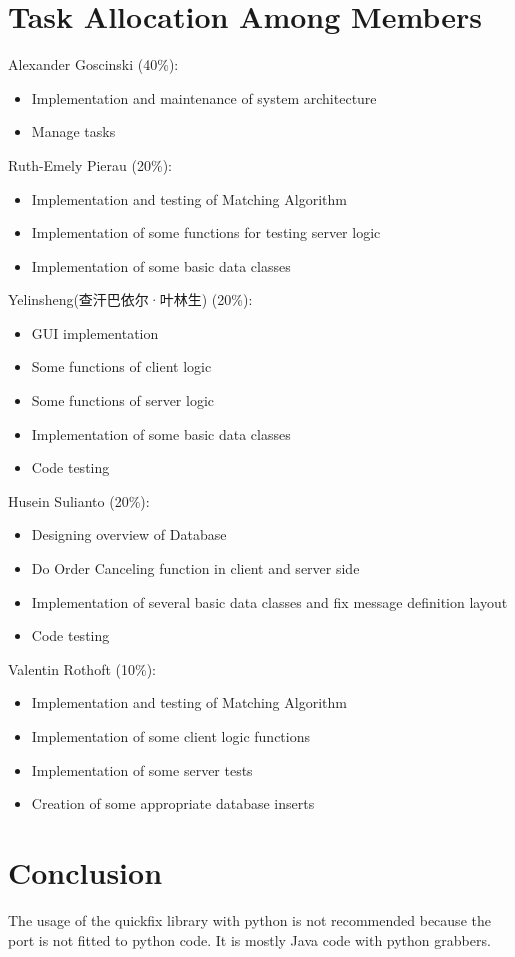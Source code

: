 \documentclass[a4paper, 11pt]{article}
\begin{document}
\section*{Task Allocation Among Members}

Alexander Goscinski (40\%):
\begin{itemize}
  \item Implementation and maintenance of system architecture
  \item Manage tasks
\end{itemize}
Ruth-Emely Pierau (20\%):
\begin{itemize}
	\item Implementation and testing of Matching Algorithm
	\item Implementation of some functions for testing server logic
	\item Implementation of some basic data classes
\end{itemize}
Yelinsheng(查汗巴依尔·叶林生) (20\%):
\begin{itemize}
  \item GUI implementation
  \item Some functions of client logic
  \item Some functions of server logic
  \item Implementation of some basic data classes
  \item Code testing
\end{itemize}
Husein Sulianto (20\%):
\begin{itemize}
  \item Designing overview of Database
  \item Do Order Canceling function in client and server side
  \item Implementation of several basic data classes and fix message definition layout
  \item Code testing
\end{itemize}
Valentin Rothoft (10\%):
\begin{itemize}
  \item Implementation and testing of Matching Algorithm
  \item Implementation of some client logic functions
  \item Implementation of some server tests
  \item Creation of some appropriate database inserts
\end{itemize}

\section*{Conclusion}
The usage of the quickfix library with python is not recommended because the port is not fitted to python code. It is mostly Java code with python grabbers.
\end{document}
